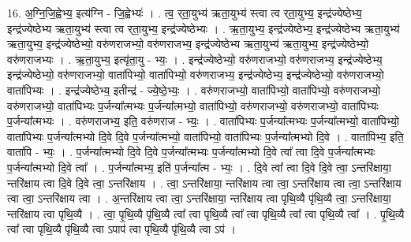 \documentclass[17pt]{extarticle}
\begin{document}
16. अ॒ग्नि॒जि॒ह्वेभ्य॒ इत्य॑ग्नि - जि॒ह्वेभ्यः॑ । . त्व॒ र्‌ता॒युभ्य॑ ऋता॒युभ्य॑ स्त्वा त्व र्‌ता॒युभ्य॒ इन्द्र॑ज्येष्ठेभ्य॒ इन्द्र॑ज्येष्ठेभ्य ऋता॒युभ्य॑ स्त्वा त्व र्‌ता॒युभ्य॒ इन्द्र॑ज्येष्ठेभ्यः । . ऋ॒ता॒युभ्य॒ इन्द्र॑ज्येष्ठेभ्य॒ इन्द्र॑ज्येष्ठेभ्य ऋता॒युभ्य॑ ऋता॒युभ्य॒ इन्द्र॑ज्येष्ठेभ्यो॒ वरु॑णराजभ्यो॒ वरु॑णराजभ्य॒ इन्द्र॑ज्येष्ठेभ्य ऋता॒युभ्य॑ ऋता॒युभ्य॒ इन्द्र॑ज्येष्ठेभ्यो॒ वरु॑णराजभ्यः । . ऋ॒ता॒युभ्य॒ इत्यृ॑ता॒यु - भ्यः॒ । . इन्द्र॑ज्येष्ठेभ्यो॒ वरु॑णराजभ्यो॒ वरु॑णराजभ्य॒ इन्द्र॑ज्येष्ठेभ्य॒ इन्द्र॑ज्येष्ठेभ्यो॒ वरु॑णराजभ्यो॒ वाता॑पिभ्यो॒ वाता॑पिभ्यो॒ वरु॑णराजभ्य॒ इन्द्र॑ज्येष्ठेभ्य॒ इन्द्र॑ज्येष्ठेभ्यो॒ वरु॑णराजभ्यो॒ वाता॑पिभ्यः । . इन्द्र॑ज्येष्ठेभ्य॒ इतीन्द्र॑ - ज्ये॒ष्ठे॒भ्यः॒ । . वरु॑णराजभ्यो॒ वाता॑पिभ्यो॒ वाता॑पिभ्यो॒ वरु॑णराजभ्यो॒ वरु॑णराजभ्यो॒ वाता॑पिभ्यः प॒र्जन्या᳚त्मभ्यः 
प॒र्जन्या᳚त्मभ्यो॒ वाता॑पिभ्यो॒ वरु॑णराजभ्यो॒ वरु॑णराजभ्यो॒ वाता॑पिभ्यः प॒र्जन्या᳚त्मभ्यः । . वरु॑णराजभ्य॒ इति॒ वरु॑णराज - भ्यः॒ । . वाता॑पिभ्यः प॒र्जन्या᳚त्मभ्यः प॒र्जन्या᳚त्मभ्यो॒ वाता॑पिभ्यो॒ वाता॑पिभ्यः प॒र्जन्या᳚त्मभ्यो दि॒वे दि॒वे प॒र्जन्या᳚त्मभ्यो॒ वाता॑पिभ्यो॒ वाता॑पिभ्यः प॒र्जन्या᳚त्मभ्यो दि॒वे । . वाता॑पिभ्य॒ इति॒ वाता॑पि - भ्यः॒ । . प॒र्जन्या᳚त्मभ्यो दि॒वे दि॒वे प॒र्जन्या᳚त्मभ्यः प॒र्जन्या᳚त्मभ्यो दि॒वे त्वा᳚ त्वा दि॒वे प॒र्जन्या᳚त्मभ्यः प॒र्जन्या᳚त्मभ्यो दि॒वे त्वा᳚ । . प॒र्जन्या᳚त्मभ्य॒ इति॑ प॒र्जन्या᳚त्म - भ्यः॒ । . दि॒वे त्वा᳚ त्वा दि॒वे दि॒वे त्वा॒ ऽन्तरि॑क्षाया॒ न्तरि॑क्षाय त्वा दि॒वे दि॒वे त्वा॒ ऽन्तरि॑क्षाय । . त्वा॒ ऽन्तरि॑क्षाया॒ न्तरि॑क्षाय त्वा त्वा॒ ऽन्तरि॑क्षाय त्वा त्वा॒ ऽन्तरि॑क्षाय त्वा त्वा॒ ऽन्तरि॑क्षाय त्वा । . अ॒न्तरि॑क्षाय त्वा त्वा॒ ऽन्तरि॑क्षाया॒ न्तरि॑क्षाय त्वा पृथि॒व्यै पृ॑थि॒व्यै त्वा॒ ऽन्तरि॑क्षाया॒ न्तरि॑क्षाय त्वा पृथि॒व्यै । . त्वा॒ पृ॒थि॒व्यै पृ॑थि॒व्यै त्वा᳚ त्वा पृथि॒व्यै त्वा᳚ त्वा पृथि॒व्यै त्वा᳚ त्वा पृथि॒व्यै त्वा᳚ । . पृ॒थि॒व्यै त्वा᳚ त्वा पृथि॒व्यै पृ॑थि॒व्यै त्वा ऽपाप॑ त्वा पृथि॒व्यै पृ॑थि॒व्यै त्वा ऽप॑ । \newline
\end{document}
